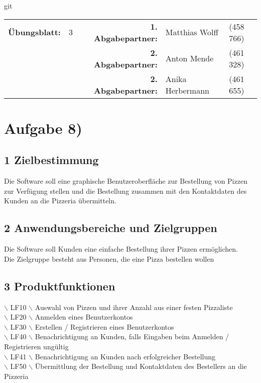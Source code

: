 \newcommand{\obenlinks}{Software Engineering}%

git 
\newcommand{\name}[1]{$\backslash$ #1 $\backslash$ \quad}		




	\begin{center}
		\begin{tabular}{|rlp{4cm}rll|}
		\hline
		 \textbf{Übungsblatt:} & 3 &   & \textbf{1. Abgabepartner:} & Matthias Wolff & (458 766)  \\
		        & & & \textbf{2. Abgabepartner:} & Anton Mende & (461 328) \\
		        & & & \textbf{2. Abgabepartner:} & Anika Herbermann & (461 655) \\ \hline
		\end{tabular}
	\end{center}
\section*{Aufgabe 8)}
\subsection*{1 Zielbestimmung}
Die Software soll eine graphische Benutzeroberfläche zur Bestellung von Pizzen zur Verfügung stellen und die Bestellung zusammen mit den Kontaktdaten des Kunden an die Pizzeria übermitteln.
\subsection*{2 Anwendungsbereiche und Zielgruppen}
Die Software soll Kunden eine einfache Bestellung ihrer Pizzen ermöglichen.\\
Die Zielgruppe besteht aus Personen, die eine Pizza bestellen wollen
\subsection*{3 Produktfunktionen}
\name{LF10} Auswahl von Pizzen und ihrer Anzahl aus einer festen Pizzaliste\\
\name{LF20} Anmelden eines Benutzerkontos\\
\name{LF30} Erstellen / Registrieren eines Benutzerkontos\\
\name{LF40} Benachrichtigung an Kunden, falls Eingaben beim Anmelden / Registrieren ungültig\\
\name{LF41} Benachrichtigung an Kunden nach erfolgreicher Bestellung\\
\name{LF50} Übermittlung der Bestellung und Kontaktdaten des Bestellers an die Pizzeria
